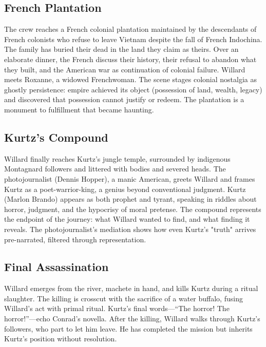 \begin{minipage}{\textwidth}
	\subsection*{French Plantation}
	\label{scene:french-plantation}

	The crew reaches a French colonial plantation maintained by the descendants of French colonists
	who refuse to leave Vietnam despite the fall of French Indochina. The family has buried their
	dead in the land they claim as theirs. Over an elaborate dinner, the French discuss their
	history, their refusal to abandon what they built, and the American war as continuation of
	colonial failure. Willard meets Roxanne, a widowed Frenchwoman. The scene stages colonial
	nostalgia as ghostly persistence: empire achieved its object (possession of land, wealth,
	legacy) and discovered that possession cannot justify or redeem. The plantation is a monument
	to fulfillment that became haunting.
\end{minipage}
\bigskip

\begin{minipage}{\textwidth}
	\subsection*{Kurtz's Compound}
	\label{scene:kurtz-compound}

	Willard finally reaches Kurtz's jungle temple, surrounded by indigenous Montagnard followers
	and littered with bodies and severed heads. The photojournalist (Dennis Hopper), a manic
	American, greets Willard and frames Kurtz as a poet-warrior-king, a genius beyond conventional
	judgment. Kurtz (Marlon Brando) appears as both prophet and tyrant, speaking in riddles about
	horror, judgment, and the hypocrisy of moral pretense. The compound represents the endpoint of
	the journey: what Willard wanted to find, and what finding it reveals. The photojournalist's
	mediation shows how even Kurtz's "truth" arrives pre-narrated, filtered through representation.
\end{minipage}
\bigskip

\begin{minipage}{\textwidth}
	\subsection*{Final Assassination}
	\label{scene:assassination}

	Willard emerges from the river, machete in hand, and kills Kurtz during a ritual slaughter.
	The killing is crosscut with the sacrifice of a water buffalo, fusing Willard's act with
	primal ritual. Kurtz's final words---``The horror! The horror!''---echo Conrad's novella.
	After the killing, Willard walks through Kurtz's followers, who part to let him leave. He has
	completed the mission but inherits Kurtz's position without resolution.
\end{minipage}
\bigskip
